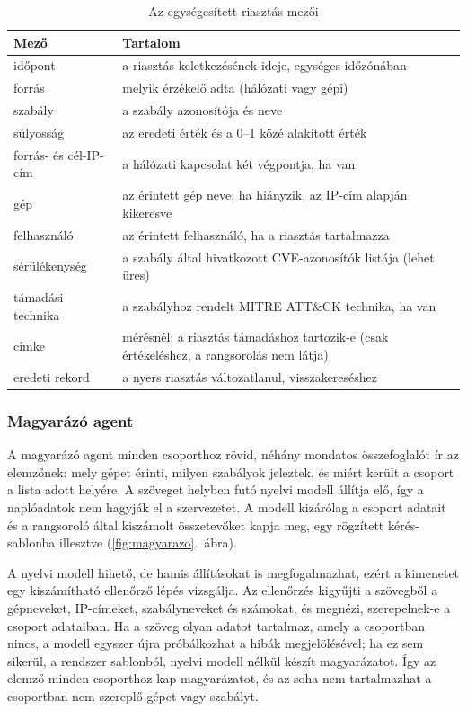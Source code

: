 \begin{table}[H]
    \centering
    \caption{Az egységesített riasztás mezői}
    \label{tab:kozos-forma}
    \small
    \begin{tabular}{|L{3.4cm}|L{10.2cm}|}
        \hline
        \textbf{Mező} & \textbf{Tartalom} \\ \hline
        időpont & a riasztás keletkezésének ideje, egységes időzónában \\ \hline
        forrás & melyik érzékelő adta (hálózati vagy gépi) \\ \hline
        szabály & a szabály azonosítója és neve \\ \hline
        súlyosság & az eredeti érték és a 0--1 közé alakított érték \\ \hline
        forrás- és cél-IP-cím & a hálózati kapcsolat két végpontja, ha van \\ \hline
        gép & az érintett gép neve; ha hiányzik, az IP-cím alapján kikeresve \\ \hline
        felhasználó & az érintett felhasználó, ha a riasztás tartalmazza \\ \hline
        sérülékenység & a szabály által hivatkozott \acs{CVE}-azonosítók listája (lehet üres) \\ \hline
        támadási technika & a szabályhoz rendelt MITRE ATT\&CK technika, ha van \\ \hline
        címke & mérésnél: a riasztás támadáshoz tartozik-e (csak értékeléshez, a rangsorolás nem látja) \\ \hline
        eredeti rekord & a nyers riasztás változatlanul, visszakereséshez \\ \hline
    \end{tabular}
\end{table}

\subsubsection{Magyarázó agent}
A magyarázó agent minden csoporthoz rövid, néhány mondatos összefoglalót ír az elemzőnek: mely gépet érinti, milyen szabályok jeleztek, és miért került a csoport a lista adott helyére. A szöveget helyben futó nyelvi modell állítja elő, így a naplóadatok nem hagyják el a szervezetet. A modell kizárólag a csoport adatait és a rangsoroló által kiszámolt összetevőket kapja meg, egy rögzített kérés-sablonba illesztve (\ref{fig:magyarazo}.~ábra).

A nyelvi modell hihető, de hamis állításokat is megfogalmazhat, ezért a kimenetet egy kiszámítható ellenőrző lépés vizsgálja. Az ellenőrzés kigyűjti a szövegből a gépneveket, IP-címeket, szabályneveket és számokat, és megnézi, szerepelnek-e a csoport adataiban. Ha a szöveg olyan adatot tartalmaz, amely a csoportban nincs, a modell egyszer újra próbálkozhat a hibák megjelölésével; ha ez sem sikerül, a rendszer sablonból, nyelvi modell nélkül készít magyarázatot. Így az elemző minden csoporthoz kap magyarázatot, és az soha nem tartalmazhat a csoportban nem szereplő gépet vagy szabályt.

